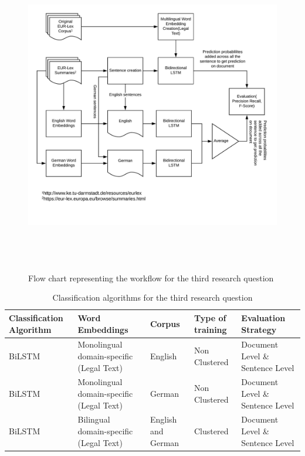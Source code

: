 \begin{figure}[!ht]
    \centering
    \includegraphics[width=15cm, height=14cm,keepaspectratio]{pics/flowforQuestion3.jpeg}
    \caption{Flow chart representing the workflow for the third research question}
    \label{fig:FlowResearchQuestion3}
\end{figure}

\begin{table}[!ht]
\begin{tabular}{>{\centering\arraybackslash}m{2.9cm}>{\centering\arraybackslash}m{2.9cm}>{\centering\arraybackslash}m{2cm}>{\centering\arraybackslash}m{2cm}>{\centering\arraybackslash}m{2.6cm}}
\hline
\textbf{Classification Algorithm} & \textbf{Word Embeddings} & \textbf{Corpus} & \textbf{Type of training} & \textbf{Evaluation Strategy} \\ \hline
\gls{BiLSTM} & Monolingual domain-specific (Legal Text) & English & Non Clustered & Document Level \&  Sentence Level \\ [0.2cm]
\gls{BiLSTM} & Monolingual domain-specific (Legal Text) & German & Non Clustered & Document Level \&  Sentence Level \\[0.2cm]

\gls{BiLSTM} & Bilingual domain-specific (Legal Text) & English and German & Clustered & Document Level \&  Sentence Level \\ \hline
\end{tabular}
\caption{Classification algorithms for the third research question}
\label{table:ListQuestionThirdQuestion}
\end{table}


